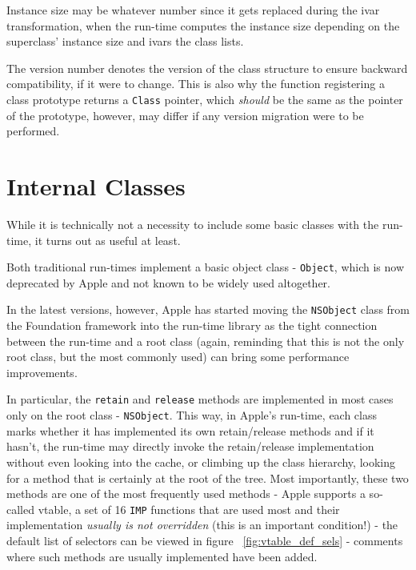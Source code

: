 Instance size may be whatever number since it gets replaced during the ivar transformation, when the run-time computes the instance size depending on the superclass' instance size and ivars the class lists.

The version number denotes the version of the class structure to ensure backward compatibility, if it were to change. This is also why the function registering a class prototype returns a \verb=Class= pointer, which \emph{should} be the same as the pointer of the prototype, however, may differ if any version migration were to be performed.

\section{Internal Classes}

While it is technically not a necessity to include some basic classes with the run-time, it turns out as useful at least.

Both traditional run-times implement a basic object class - \verb=Object=, which is now deprecated by Apple and not known to be widely used altogether.

In the latest versions, however, Apple has started moving the \verb=NSObject= class from the Foundation framework into the run-time library as the tight connection between the run-time and a root class (again, reminding that this is not the only root class, but the most commonly used) can bring some performance improvements.

In particular, the \verb=retain= and \verb=release= methods are implemented in most cases only on the root class - \verb=NSObject=. This way, in Apple's run-time, each class marks whether it has implemented its own retain/release methods and if it hasn't, the run-time may directly invoke the retain/release implementation without even looking into the cache, or climbing up the class hierarchy, looking for a method that is certainly at the root of the tree. Most importantly, these two methods are one of the most frequently used methods - Apple supports a so-called vtable, a set of 16 \verb=IMP= functions that are used most and their implementation \emph{usually is not overridden} (this is an important condition!) - the default list of selectors can be viewed in figure ~\ref{fig:vtable_def_sels} - comments where such methods are usually implemented have been added.

